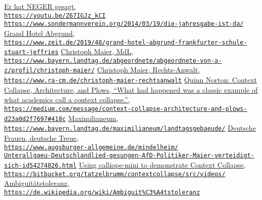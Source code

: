 \documentclass[a4,parindent=0pt]{article}
\begin{document}
\begin{thebibliography}{88}
  \href{https://youtu.be/Z67IGJz_kCI}{Er hat NEGER gesagt,\\
\texttt{https://youtu.be/Z67IGJz\_kCI}}
  \href{https://www.sondermannverein.org/2014/03/19/die-jahresgabe-ist-da/}{\texttt{https://www.sondermannverein.org/2014/03/19/die-jahresgabe-ist-da/}}
  \href{https://www.zeit.de/2019/48/grand-hotel-abgrund-frankfurter-schule-stuart-jeffries}{Grand
  Hotel Abgrund,\\
\texttt{https://www.zeit.de/2019/48/grand-hotel-abgrund-frankfurter-schule-stuart-jeffries}}
  \href{https://www.bayern.landtag.de/abgeordnete/abgeordnete-von-a-z/profil/christoph-maier/}{Christoph
  Maier, MdL,\\
\texttt{https://www.bayern.landtag.de/abgeordnete/abgeordnete-von-a-z/profil/christoph-maier/}}
  \href{https://www.ra-cm.de/christoph-maier-rechtsanwalt}{Christoph
  Maier, Rechts-Anwalt,\\
\texttt{https://www.ra-cm.de/christoph-maier-rechtsanwalt}}
  \href{https://medium.com/message/context-collapse-architecture-and-plows-d23a0d2f7697#418c}{Quinn Norton: Context Collapse, Architecture, and Plows, 
``What had happened was a classic example of what academics call a context collapse.'',\\
\texttt{https://medium.com/message/context-collapse-architecture-and-plows-d23a0d2f7697\#418c}}
  \href{https://www.bayern.landtag.de/maximilianeum/landtagsgebaeude/}{Maximilianeum,\\
\texttt{https://www.bayern.landtag.de/maximilianeum/landtagsgebaeude/}}
  \href{https://www.augsburger-allgemeine.de/mindelheim/Unterallgaeu-Deutschlandlied-gesungen-AfD-Politiker-Maier-verteidigt-sich-id54274826.html}{Deutsche
  Frauen, deutsche Treue,\\
\texttt{https://www.augsburger-allgemeine.de/mindelheim/\\Unterallgaeu-Deutschlandlied-gesungen-AfD-Politiker-Maier-verteidigt-sich-id54274826.html}}
  \href{https://bitbucket.org/tatzelbrumm/contextcollapse/src/videos/}{Using
  calliope-mini to demonstrate Context Collapse,\\
\texttt{https://bitbucket.org/tatzelbrumm/contextcollapse/src/videos/}}
  \href{https://de.wikipedia.org/wiki/Ambiguit\%C3\%A4tstoleranz}{Ambiguitätstoleranz,\\
\texttt{https://de.wikipedia.org/wiki/Ambiguit\%C3\%A4tstoleranz}}

\end{thebibliography}
\end{document}
